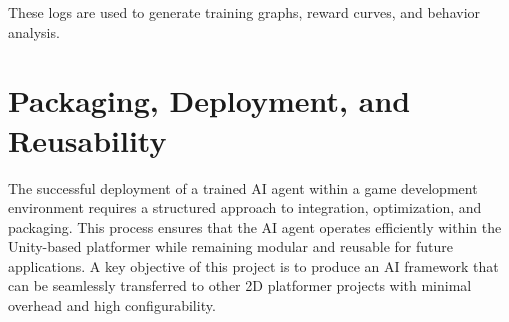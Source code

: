 \documentclass[12pt,oneside,openright,a4paper]{cpe-english-project}
\begin{document}
These logs are used to generate training graphs, reward curves, and behavior analysis.








\section{Packaging, Deployment, and Reusability}
The successful deployment of a trained AI agent within a game development environment requires a structured approach to integration, optimization, and packaging. This process ensures that the AI agent operates efficiently within the Unity-based platformer while remaining modular and reusable for future applications. A key objective of this project is to produce an AI framework that can be seamlessly transferred to other 2D platformer projects with minimal overhead and high configurability.\par
\end{document}
